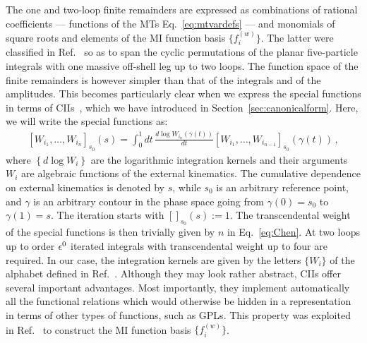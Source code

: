 \documentclass[main.tex]{subfiles}
\begin{document}
\label{Hbbsec:Hbasis}
The one and two-loop finite remainders are expressed as combinations of rational coefficients --- functions of the MTs Eq.~\ref{eq:mtvardefs} --- and monomials of square roots and elements of the MI function basis $\{f^{(w)}_i\}$. The latter were classified in Ref.~\cite{Badger:2021nhg} so as to span the cyclic permutations of the planar five-particle integrals with one massive off-shell leg up to two loops. The function space of the finite remainders is however simpler than that of the integrals and of the amplitudes. This becomes particularly clear when we express the special functions in terms of CIIs~\cite{Chen:1977oja}, which we have introduced in Section~\ref{sec:canonicalform}. Here, we will write the special functions as:
\begin{align} \label{eq:Chen}
\left[W_{i_1}, \ldots, W_{i_n}  \right]_{s_0} (s) = \int_0^1 dt \, \frac{d \log W_{i_n}\left(\gamma(t)\right)}{dt} \left[W_{i_1}, \ldots, W_{i_{n-1}}  \right]_{s_0} \left(\gamma(t)\right) \,,
\end{align}
where $\left\{ d\log W_i \right\}$ are the logarithmic integration kernels and their arguments $W_i$ are algebraic functions of the external kinematics. The cumulative dependence on external kinematics is denoted by $s$, while $s_0$ is an arbitrary reference point, and $\gamma$ is an arbitrary contour in the phase space going from $\gamma(0)=s_0$ to $\gamma(1)=s$. The iteration starts with $[]_{s_0}(s) := 1$. The transcendental weight of the special functions is then trivially given by $n$ in Eq.~\ref{eq:Chen}. At two loops up to order $\epsilon^0$ iterated integrals with transcendental weight up to four are required. In our case, the integration kernels are given by the letters $\{W_i\}$ of the alphabet defined in Ref.~\cite{Abreu:2020jxa}. 
Although they may look rather abstract, CIIs offer several important advantages. Most importantly, they implement automatically all the functional relations which would otherwise be hidden in a representation in terms of other types of functions, such as GPLs. This property was exploited in Ref.~\cite{Badger:2021nhg} to construct the MI function basis $\{f^{(w)}_i\}$. 
\end{document}
